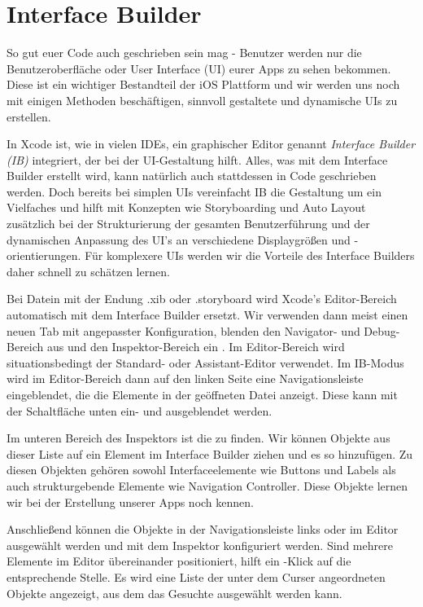 \documentclass[parskip=half, final]{scrreprt}
\begin{document}
\section{Interface Builder}\label{sec:ib}

So gut euer Code auch geschrieben sein mag - Benutzer werden nur die Benutzeroberfläche oder User Interface (UI) eurer Apps zu sehen bekommen. Diese ist ein wichtiger Bestandteil der iOS Plattform und wir werden uns noch mit einigen Methoden beschäftigen, sinnvoll gestaltete und dynamische UIs zu erstellen.

In Xcode ist, wie in vielen IDEs, ein graphischer Editor genannt \emph{Interface Builder (IB)} integriert, der bei der UI-Gestaltung hilft. Alles, was mit dem Interface Builder erstellt wird, kann natürlich auch stattdessen in Code geschrieben werden. Doch bereits bei simplen UIs vereinfacht IB die Gestaltung um ein Vielfaches und hilft mit Konzepten wie Storyboarding und Auto Layout zusätzlich bei der Strukturierung der gesamten Benutzerführung und der dynamischen Anpassung des UI's an verschiedene Displaygrößen und -orientierungen. Für komplexere UIs werden wir die Vorteile des Interface Builders daher schnell zu schätzen lernen.

Bei Datein mit der Endung .xib oder .storyboard wird Xcode's Editor-Bereich automatisch mit dem Interface Builder ersetzt. Wir verwenden dann meist einen neuen Tab mit angepasster Konfiguration, blenden den Navigator- und Debug-Bereich aus und den Inspektor-Bereich ein . Im Editor-Bereich wird situationsbedingt der Standard- oder Assistant-Editor verwendet. Im IB-Modus wird im Editor-Bereich dann auf den linken Seite eine Navigationsleiste eingeblendet, die die Elemente in der geöffneten Datei anzeigt. Diese kann mit der Schaltfläche unten ein- und ausgeblendet werden.


Im unteren Bereich des Inspektors ist die  zu finden. Wir können Objekte aus dieser Liste auf ein Element im Interface Builder ziehen und es so hinzufügen. Zu diesen Objekten gehören sowohl Interfaceelemente wie Buttons und Labels als auch strukturgebende Elemente wie Navigation Controller. Diese Objekte lernen wir bei der Erstellung unserer Apps noch kennen.

Anschließend können die Objekte in der Navigationsleiste links oder im Editor ausgewählt werden und mit dem Inspektor konfiguriert werden. Sind mehrere Elemente im Editor übereinander positioniert, hilft ein \keysc{\shiftkey}-Klick auf die entsprechende Stelle. Es wird eine Liste der unter dem Curser angeordneten Objekte angezeigt, aus dem das Gesuchte ausgewählt werden kann. 
\end{document}
